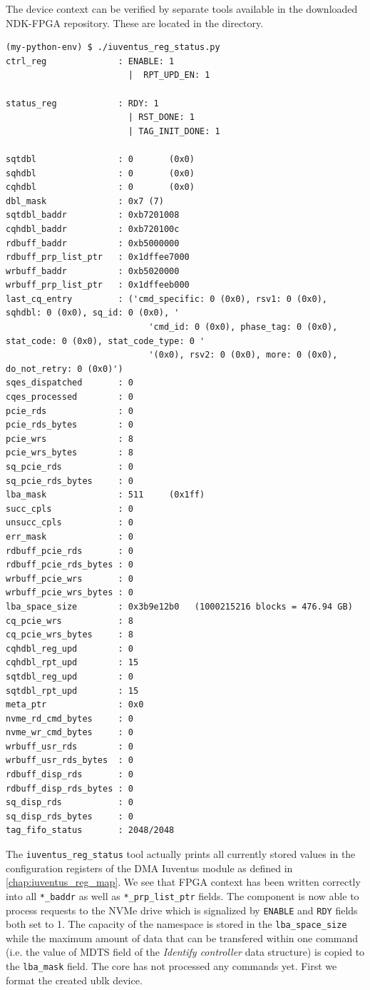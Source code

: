 The device context can be verified by separate tools available in the downloaded NDK-FPGA
repository. These are located in the  directory.

\begin{lstlisting}[caption={Verifying NFB device context}]
(my-python-env) $ ./iuventus_reg_status.py
ctrl_reg              : ENABLE: 1
                        |  RPT_UPD_EN: 1

status_reg            : RDY: 1
                        | RST_DONE: 1
                        | TAG_INIT_DONE: 1

sqtdbl                : 0		(0x0)
sqhdbl                : 0		(0x0)
cqhdbl                : 0		(0x0)
dbl_mask              : 0x7	(7)
sqtdbl_baddr          : 0xb7201008
cqhdbl_baddr          : 0xb720100c
rdbuff_baddr          : 0xb5000000
rdbuff_prp_list_ptr   : 0x1dffee7000
wrbuff_baddr          : 0xb5020000
wrbuff_prp_list_ptr   : 0x1dffeeb000
last_cq_entry         : ('cmd_specific: 0 (0x0), rsv1: 0 (0x0), sqhdbl: 0 (0x0), sq_id: 0 (0x0), '
                            'cmd_id: 0 (0x0), phase_tag: 0 (0x0), stat_code: 0 (0x0), stat_code_type: 0 '
                            '(0x0), rsv2: 0 (0x0), more: 0 (0x0), do_not_retry: 0 (0x0)')
sqes_dispatched       : 0
cqes_processed        : 0
pcie_rds              : 0
pcie_rds_bytes        : 0
pcie_wrs              : 8
pcie_wrs_bytes        : 8
sq_pcie_rds           : 0
sq_pcie_rds_bytes     : 0
lba_mask              : 511		(0x1ff)
succ_cpls             : 0
unsucc_cpls           : 0
err_mask              : 0
rdbuff_pcie_rds       : 0
rdbuff_pcie_rds_bytes : 0
wrbuff_pcie_wrs       : 0
wrbuff_pcie_wrs_bytes : 0
lba_space_size        : 0x3b9e12b0	 (1000215216 blocks = 476.94 GB)
cq_pcie_wrs           : 8
cq_pcie_wrs_bytes     : 8
cqhdbl_reg_upd        : 0
cqhdbl_rpt_upd        : 15
sqtdbl_reg_upd        : 0
sqtdbl_rpt_upd        : 15
meta_ptr              : 0x0
nvme_rd_cmd_bytes     : 0
nvme_wr_cmd_bytes     : 0
wrbuff_usr_rds        : 0
wrbuff_usr_rds_bytes  : 0
rdbuff_disp_rds       : 0
rdbuff_disp_rds_bytes : 0
sq_disp_rds           : 0
sq_disp_rds_bytes     : 0
tag_fifo_status       : 2048/2048
\end{lstlisting}

The \verb|iuventus_reg_status| tool actually prints all currently stored values in the configuration
registers of the DMA Iuventus module as defined in \cref{chap:iuventus_reg_map}. We see that FPGA
context has been written correctly into all \verb|*_baddr| as well as \verb|*_prp_list_ptr| fields.
The component is now able to process requests to the NVMe drive which is signalized by \verb|ENABLE|
and \verb|RDY| fields both set to 1. The capacity of the namespace is stored in the
\verb|lba_space_size| while the maximum amount of data that can be transfered within one command
(i.e. the value of \ac{MDTS} field of the \emph{Identify controller} data structure) is copied to
the \verb|lba_mask| field. The core has not processed any commands yet. First we format the created
ublk device.%

